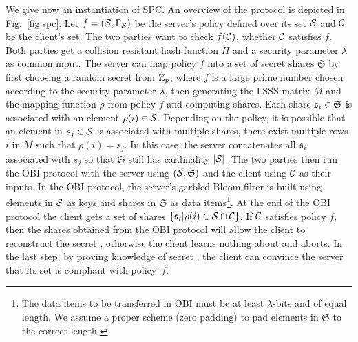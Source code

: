 \noindent
We give now an instantiation of \ac{SPC}.
An overview of the protocol is depicted in Fig.~\ref{fig:spc}. 
Let $f=(\mathcal{S},\Gamma_\mathcal{S})$ be the server's policy defined over its set $\mathcal{S}$ and $\mathcal{C}$ be the client's set. 
The two parties want to check $f(\mathcal{C})$, \ie whether $\mathcal{C}$ satisfies $f$. 
Both parties get a collision resistant hash function $H$ and a security parameter $\lambda$ as common input. 
The server can map policy $f$ into a set of secret shares $\mathfrak{S}$ by first choosing a random secret \secret from $\mathbb{Z}_p$, where $f$ is a large prime number chosen according to the security parameter $\lambda$, then generating the \ac{LSSS} matrix $M$ and the mapping function $\rho$ from policy $f$ and computing shares. 
Each share $\mathfrak{s}_i \in \mathfrak{S}$ is associated with an element $\rho(i)\in \mathcal{S}$. 
Depending on the policy, it is possible that an element in $s_j\in\mathcal{S}$ is associated with multiple shares, \ie there exist multiple rows $i$ in $M$ such that $\rho(i)=s_j$. 
In this case, the server concatenates all $\mathfrak{s}_i$ associated with $s_j$ so that $\mathfrak{S}$ still has cardinality $|\mathcal{S}|$. 
The two parties then run the \ac{OBI} protocol with the server using $(\mathcal{S}, \mathfrak{S})$ and the client using $\mathcal{C}$ as their inputs. 
In the \ac{OBI} protocol, the server's garbled Bloom filter is built using elements in $\mathcal{S}$ as keys and shares in $\mathfrak{S}$ as data items\footnote{The data items to be transferred in \ac{OBI} must be at least $\lambda$-bits and of equal length. 
We assume a proper scheme (\eg zero padding) to pad elements in $\mathfrak{S}$ to the correct length.}.
At the end of the \ac{OBI} protocol the client gets a set of shares $\{\mathfrak{s}_i|\rho(i)\in \mathcal{S}\cap \mathcal{C}\}$. 
If $\mathcal{C}$ satisfies policy $f$, then the shares obtained from the \ac{OBI} protocol will allow the client to reconstruct the secret \secret, otherwise the client learns nothing about \secret and aborts. 
In the last step, by proving knowledge of secret \secret, the client can convince the server that its set is compliant with policy~$f$.


